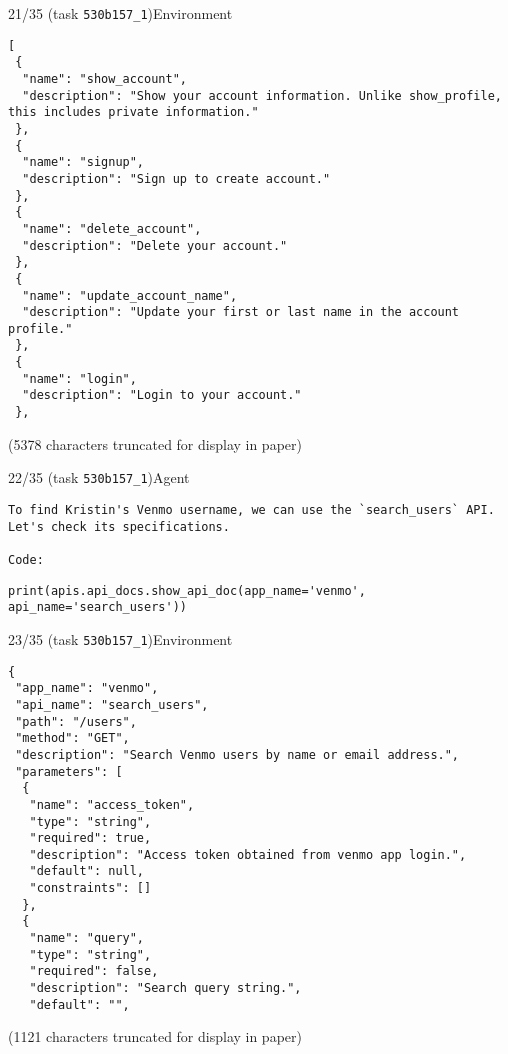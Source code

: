 \hspace*{8mm}%
\begin{minipage}{0.95\linewidth}
\begin{user_message_box}{{21/35 (task \texttt{530b157\_1})\hfill Environment}}
\scriptsize
\begin{Verbatim}[breaklines]
[
 {
  "name": "show_account",
  "description": "Show your account information. Unlike show_profile, this includes private information."
 },
 {
  "name": "signup",
  "description": "Sign up to create account."
 },
 {
  "name": "delete_account",
  "description": "Delete your account."
 },
 {
  "name": "update_account_name",
  "description": "Update your first or last name in the account profile."
 },
 {
  "name": "login",
  "description": "Login to your account."
 },
\end{Verbatim}
(5378 characters truncated for display in paper)\end{user_message_box}
\end{minipage}

\begin{minipage}{0.95\linewidth}
\begin{assistant_message_box}{{22/35 (task \texttt{530b157\_1})\hfill Agent}}
\scriptsize
\begin{Verbatim}[breaklines]
To find Kristin's Venmo username, we can use the `search_users` API. Let's check its specifications.

Code:
\end{Verbatim}
\begin{tcolorbox}[colback=codebgcolor,boxrule=0pt]\begin{Verbatim}[breaklines]
print(apis.api_docs.show_api_doc(app_name='venmo', api_name='search_users'))
\end{Verbatim}
\end{tcolorbox}\end{assistant_message_box}
\end{minipage}

\hspace*{8mm}%
\begin{minipage}{0.95\linewidth}
\begin{user_message_box}{{23/35 (task \texttt{530b157\_1})\hfill Environment}}
\scriptsize
\begin{Verbatim}[breaklines]
{
 "app_name": "venmo",
 "api_name": "search_users",
 "path": "/users",
 "method": "GET",
 "description": "Search Venmo users by name or email address.",
 "parameters": [
  {
   "name": "access_token",
   "type": "string",
   "required": true,
   "description": "Access token obtained from venmo app login.",
   "default": null,
   "constraints": []
  },
  {
   "name": "query",
   "type": "string",
   "required": false,
   "description": "Search query string.",
   "default": "",
\end{Verbatim}
(1121 characters truncated for display in paper)\end{user_message_box}
\end{minipage}

